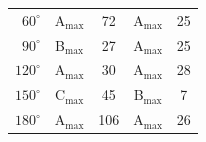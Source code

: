 \begin{minipage}{\textwidth}
\begin{minipage}[b]{0.4\textwidth}
\begin{tabular}{|r|cc|cc|}
			$ 60^\circ $ 		&      A$_{\max}$     		&     72     &    	A$_{\max}$   &  25 \\ 
			$ 90^\circ $ 		&      B$_{\max}$     		&     27     &    	A$_{\max}$   &  25 \\ 
			$ 120^\circ $ 		&      A$_{\max}$     		&     30     &      A$_{\max}$   &  28 \\ 
			$ 150^\circ $ 		&      C$_{\max}$     		&     45     &  	B$_{\max}$   &  7 \\
			$ 180^\circ $ 		&      A$_{\max}$     		&     106    &  	A$_{\max}$   &  26 \\ \hline
		\end{tabular}
		\vspace{2mm}
		\label{tab:elip2max}
		\egroup
	\end{minipage}
	\hfill
\end{minipage}


